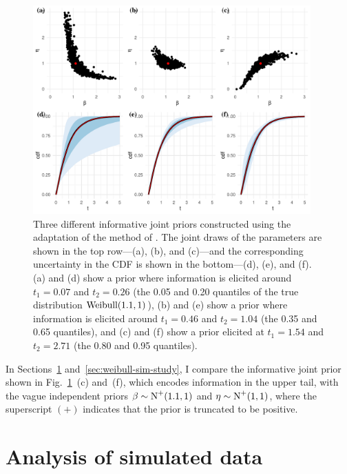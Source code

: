 \begin{figure}[tbp]
    \centering
    \includegraphics[width=0.95\textwidth]{./figures/ch-2/joint-priors.pdf}
    \caption{Three different informative joint priors constructed using the adaptation of the method of \citet{kaminskiy2005}. The joint draws of the parameters are shown in the top row---(a), (b), and (c)---and the corresponding uncertainty in the CDF is shown in the bottom---(d), (e), and (f). (a) and (d) show a prior where information is elicited around $t_1 = 0.07$ and $t_2 = 0.26$ (the 0.05 and 0.20 quantiles of the true distribution $\hbox{Weibull}(1.1, 1)$), (b) and (e) show a prior where information is elicited around $t_1 = 0.46$ and $t_2 = 1.04$ (the 0.35 and 0.65 quantiles), and (c) and (f) show a prior elicited at $t_1 = 1.54$ and $t_2 = 2.71$ (the 0.80 and 0.95 quantiles).}
    \label{fig:kaminskiy-join-priors}
\end{figure}

In Sections~\ref{sec:weibull-sim-example} and~\ref{sec:weibull-sim-study}, I compare the informative joint prior shown in Fig.~\ref{fig:kaminskiy-join-priors}~(c) and~(f), which encodes information in the upper tail, with the vague independent priors $\beta \sim \hbox{N}^{+}(1.1, 1)$ and $\eta \sim \hbox{N}^{+}(1, 1)$, where the superscript $(+)$ indicates that the prior is truncated to be positive. 

\section{Analysis of simulated data} \label{sec:weibull-sim-example}

